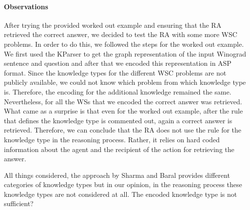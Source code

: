 \paragraph{Observations}
After trying the provided worked out example and ensuring that the RA retrieved the correct answer, we decided to test the RA with some more WSC problems. %
In order to do this, we followed the steps for the worked out example. We first used the KParser to get the graph representation of the input Winograd sentence and question and after that we encoded this representation in ASP format. Since the knowledge types for the different WSC problems are not publicly available, we could not know which problem from which knowledge type is. Therefore, the encoding for the additional knowledge remained the same. Nevertheless, for all the WSs that we encoded the correct answer was retrieved. 
What came as a surprise is that even for the worked out example, after the rule that defines the knowledge type is commented out, again a correct answer is retrieved. Therefore, we can conclude that the RA does not use the rule for the knowledge type in the reasoning process. Rather, it relies on hard coded information about the agent and the recipient of the action for retrieving the answer. 

All things considered, the approach by Sharma and Baral \cite{2018CommonsenseKT} provides different categories of knowledge types but in our opinion, in the reasoning process these knowledge types are not considered at all.  The encoded knowledge type is not sufficient?

